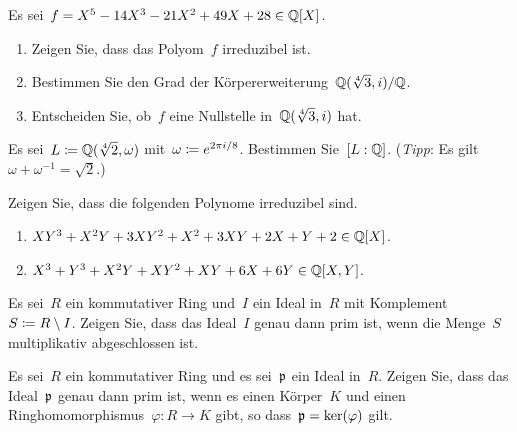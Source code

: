 \documentclass{scrartcl}
\begin{document}
\begin{exercise}[subtitle = {Erstklausur~19/20}]
  Es sei~$f = X^5 - 14 X^3 - 21 X^2 + 49 X + 28 \in \mathbb{Q}[X]$.
  \begin{enumerate}
    \item
      Zeigen Sie, dass das Polyom~$f$ irreduzibel ist.
    \item
      Bestimmen Sie den Grad der Körpererweiterung~$\mathbb{Q}(\sqrt[4]{3}, i) / \mathbb{Q}$.
    \item
      Entscheiden Sie, ob~$f$ eine Nullstelle in~$\mathbb{Q}(\sqrt[4]{3}, i)$ hat.
  \end{enumerate}
\end{exercise}

\begin{exercise}[subtitle = {Erstklausur~18/19}]
  Es sei~$L \coloneqq \mathbb{Q}(\sqrt[4]{2}, \omega)$ mit~$\omega \coloneqq e^{2 \pi i / 8}$.
  Bestimmen Sie~$[L : \mathbb{Q}]$.
  (\emph{Tipp}: Es gilt~$\omega + \omega^{-1} = \sqrt{2}$.)
\end{exercise}

\begin{exercise}
  Zeigen Sie, dass die folgenden Polynome irreduzibel sind.
  \begin{enumerate}
    \item
      $X Y^3 + X^2 Y + 3 X Y^2 + X^2 + 3 X Y + 2 X + Y + 2 \in \mathbb{Q}[X]$.
    \item
      $X^3 + Y^3 + X^2 Y + X Y^2 + XY + 6X + 6Y \in \mathbb{Q}[X,Y]$.
  \end{enumerate}
\end{exercise}

\begin{exercise}
  Es sei~$R$ ein kommutativer Ring und~$I$ ein Ideal in~$R$ mit Komplement~$S \coloneqq R \setminus I$.
  Zeigen Sie, dass das Ideal~$I$ genau dann prim ist, wenn die Menge~$S$ multiplikativ abgeschlossen ist.
\end{exercise}

\begin{exercise}
  Es sei~$R$ ein kommutativer Ring und es sei~$\mathfrak{p}$ ein Ideal in~$R$.
  Zeigen Sie, dass das Ideal~$\mathfrak{p}$ genau dann prim ist, wenn es einen Körper~$K$ und einen Ringhomomorphismus~$\varphi \colon R \to K$ gibt, so dass~$\mathfrak{p} = \ker(\varphi)$ gilt.
\end{exercise}





\clearpage




\printsolutions
\end{document}
